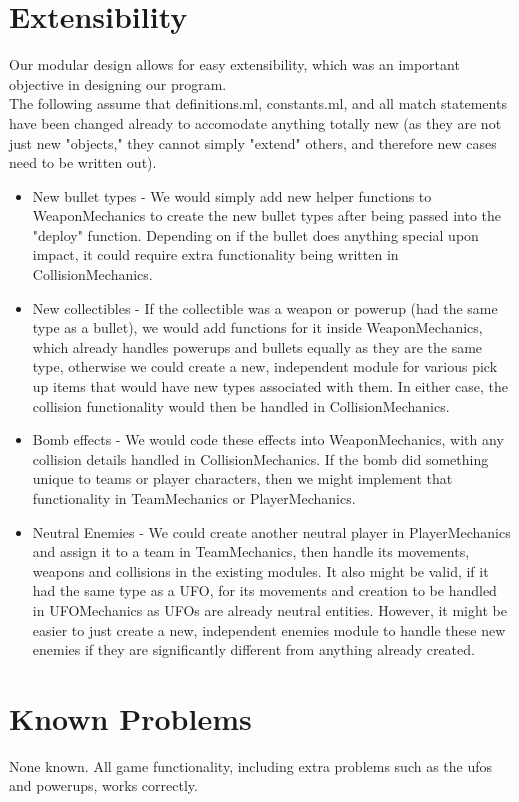 \documentclass{article}
\begin{document}
\section{Extensibility}

Our modular design allows for easy extensibility, which was an important objective in designing our program. \\

The following assume that definitions.ml, constants.ml, and all match statements have been changed already to accomodate anything totally new (as they are not just new "objects," they cannot simply "extend" others, and therefore new cases need to be written out).
\begin{itemize}
\item New bullet types - We would simply add new helper functions to WeaponMechanics to create the new bullet types after being passed into the "deploy" function. Depending on if the bullet does anything special upon impact, it could require extra functionality being written in CollisionMechanics. 
\item New collectibles - If the collectible was a weapon or powerup (had the same type as a bullet), we would add functions for it inside WeaponMechanics, which already handles powerups and bullets equally as they are the same type, otherwise we could create a new, independent module for various pick up items that would have new types associated with them. In either case, the collision functionality would then be handled in CollisionMechanics. 
\item Bomb effects - We would code these effects into WeaponMechanics, with any collision details handled in CollisionMechanics. If the bomb did 
something unique to teams or player characters, then we might implement that functionality in TeamMechanics or PlayerMechanics.
\item Neutral Enemies - We could create another neutral player in PlayerMechanics and assign it to a team in TeamMechanics, then handle its
movements, weapons and collisions in the existing modules. It also might be valid, if it had the same type as a UFO, for its movements and creation to be handled in UFOMechanics as UFOs are already neutral entities. However, it might be easier to just create a new, independent enemies module to handle these new enemies if they are significantly different from anything already created.
\end{itemize}

\section {Known Problems}
None known. All game functionality, including extra problems such as the ufos and powerups, works correctly.
\end{document}
